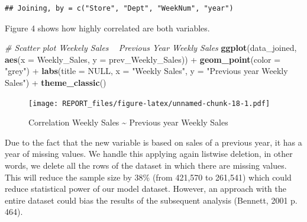 \documentclass[11pt,]{article}
\newenvironment{Shaded}{\begin{snugshade}}{\end{snugshade}}
\newcommand{\KeywordTok}[1]{\textcolor[rgb]{0.13,0.29,0.53}{\textbf{{#1}}}}
\newcommand{\DataTypeTok}[1]{\textcolor[rgb]{0.13,0.29,0.53}{{#1}}}
\newcommand{\DecValTok}[1]{\textcolor[rgb]{0.00,0.00,0.81}{{#1}}}
\newcommand{\StringTok}[1]{\textcolor[rgb]{0.31,0.60,0.02}{{#1}}}
\newcommand{\CommentTok}[1]{\textcolor[rgb]{0.56,0.35,0.01}{\textit{{#1}}}}
\newcommand{\OtherTok}[1]{\textcolor[rgb]{0.56,0.35,0.01}{{#1}}}
\newcommand{\NormalTok}[1]{{#1}}
\begin{document}
\begin{Shaded}
\end{Shaded}

\begin{verbatim}
## Joining, by = c("Store", "Dept", "WeekNum", "year")
\end{verbatim}

Figure 4 shows how highly correlated are both variables.

\begin{Shaded}
\begin{Highlighting}[]
\CommentTok{# Scatter plot Weekely Sales ~ Previous Year Weekly Sales}
\KeywordTok{ggplot}\NormalTok{(data_joined, }\KeywordTok{aes}\NormalTok{(}\DataTypeTok{x =} \NormalTok{Weekly_Sales, }\DataTypeTok{y =} \NormalTok{prev_Weekly_Sales)) +}\StringTok{ }
\StringTok{    }\KeywordTok{geom_point}\NormalTok{(}\DataTypeTok{color =} \StringTok{"grey"}\NormalTok{) +}\StringTok{ }\KeywordTok{labs}\NormalTok{(}\DataTypeTok{title =} \OtherTok{NULL}\NormalTok{, }\DataTypeTok{x =} \StringTok{"Weekly Sales"}\NormalTok{, }
    \DataTypeTok{y =} \StringTok{"Previous year Weekly Sales"}\NormalTok{) +}\StringTok{ }\KeywordTok{theme_classic}\NormalTok{()}
\end{Highlighting}
\end{Shaded}

\begin{figure}[htbp]
\centering
\texttt{[image: REPORT\_files/figure-latex/unnamed-chunk-18-1.pdf]}
\caption{Correlation Weekly Sales \textasciitilde{} Previous year Weekly
Sales}
\end{figure}

Due to the fact that the new variable is based on sales of a previous
year, it has a year of missing values. We handle this applying again
listwise deletion, in other words, we delete all the rows of the dataset
in which there are missing values. This will reduce the sample size by
38\% (from 421,570 to 261,541) which could reduce statistical power of
our model dataset. However, an approach with the entire dataset could
bias the results of the subsequent analysis (Bennett, 2001 p. 464).
\end{document}
